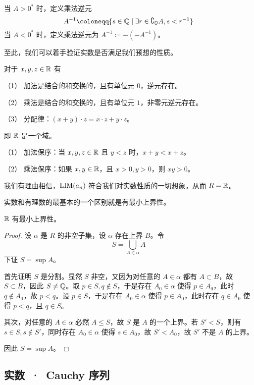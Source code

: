 当 $A > 0^*$ 时，定义乘法逆元
$$A^{-1} \coloneqq  \{s \in \QQ \mid \exists r \in \complement_\QQ A, s < r^{-1}\}$$
当 $A < 0^*$ 时，定义乘法逆元为 $A^{-1} \coloneqq  -(-A^{-1})$。

至此，我们可以着手验证实数是否满足我们预想的性质。

\begin{theorem}[$\RR$ 的代数算律]
	对于 $x,y,z\in \mathbb{R}$ 有

	（1） 加法是结合的和交换的，且有单位元 $0$，逆元存在。

	（2） 乘法是结合的和交换的，且有单位元 $1$，非零元逆元存在。

	（3） 分配律：$(x+y) \cdot  z = x \cdot z + y\cdot z$。
\end{theorem}

即 $\RR$ 是一个域。

\begin{theorem}[$\RR$ 是有序域]
	（1） 加法保序：当 $x,y,z\in \mathbb{R}$ 且 $y<z$ 时，$x+y<x+z$。

	（2） 乘法保序：如果 $x,y\in \mathbb{R}$，且 $x>0,y>0$，则 $xy>0$。
\end{theorem}

我们有理由相信，$\operatorname{{LIM}}(a_n)$ 符合我们对实数性质的一切想象，从而 $R = \mathbb{R}$。

实数和有理数的最基本的一个区别就是有最小上界性。

\begin{theorem}
	$\RR$ 有最小上界性。
\end{theorem}
\begin{proof}
	设 $\alpha$ 是 $R$ 的非空子集，设 $\alpha$ 存在上界 $B$。令
	$$S = \bigcup_{A \in \alpha} A$$
	下证 $S = \sup A$。

	首先证明 $S$ 是分割。显然 $S$ 非空，又因为对任意的 $A\in \alpha$ 都有 $A \subset B$，故 $S \subset B$，因此 $S \ne \mathbb{Q}$。取 $p \in S,q\notin S$，于是存在 $A_0 \in \alpha$ 使得 $p \in A_0$，此时 $q \notin A_0$，故 $p<q$。设 $p \in S$，于是存在 $A_0 \in \alpha$ 使得 $p \in A_0$，此时存在 $q\in A_0$ 使得 $p < q$，且 $q \in S$。

	其次，对任意的 $A \in \alpha$ 必然 $A \leqslant S$，故 $S$ 是 $A$ 的一个上界。若 $S' < S$，则有 $s \in S, s \notin S'$，同时存在 $A_0 \in \alpha$ 使得 $s \in A_0$，故 $S' < A_0$，故 $S'$ 不是 $A$ 的上界。

	因此 $S = \sup A$。
\end{proof}

\subsection{实数\ ·\ Cauchy 序列}

